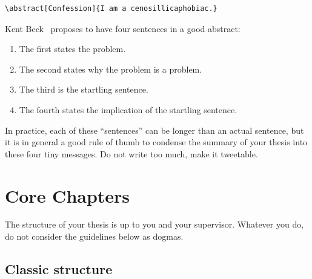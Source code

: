 \documentclass{uvamscse}
\begin{document}
\begin{snippet}
\begin{verbatim}
\abstract[Confession]{I am a cenosillicaphobiac.}
\end{verbatim}
\end{snippet}

Kent Beck~\cite{JohnsonBBCGW93} proposes to have four sentences in a good abstract:

\begin{enumerate}
  \item The first states the problem.
  \item The second states why the problem is a problem.
  \item The third is the startling sentence.
  \item The fourth states the implication of the startling sentence.
\end{enumerate}

In practice, each of these ``sentences'' can be longer than an actual
sentence, but it is in general a good rule of thumb to condense the summary of
your thesis into these four tiny messages. Do not write too much, make it
tweetable.

\chapter{Core Chapters}

The structure of your thesis is up to you and your supervisor. Whatever you
do, do not consider the guidelines below as dogmas.

\section{Classic structure}
\end{document}
